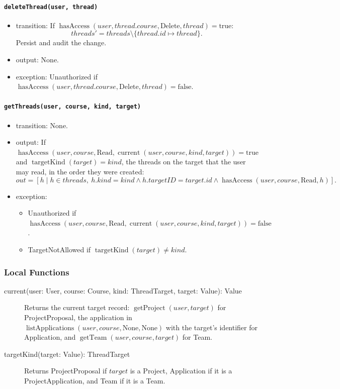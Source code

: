 \documentclass[12pt, titlepage]{article}
\begin{document}
\paragraph{\texttt{deleteThread(user, thread)}}
\begin{itemize}
    \item transition: If $\operatorname{hasAccess}(user,thread.course,\text{Delete},thread)=\text{true}$:
    \[
    \mathit{threads}'=\mathit{threads}\setminus\{thread.id\mapsto thread\}.
    \]
    Persist and audit the change.
    \item output: None.
    \item exception: Unauthorized if $\operatorname{hasAccess}(user,thread.course,\text{Delete},thread)=\text{false}$.
\end{itemize}

\paragraph{\texttt{getThreads(user, course, kind, target)}}
\begin{itemize}
    \item transition: None.
    \item output: If $\operatorname{hasAccess}(user,course,\text{Read},\operatorname{current}(user,course,kind,target))=\text{true}$ and $\operatorname{targetKind}(target)=kind$, the threads on the target that the user may read, in the order they were created:
    \[
    out=[h\mid h\in\mathit{threads},\ h.kind=kind\land h.targetID=target.id\land\operatorname{hasAccess}(user,course,\text{Read},h)].
    \]
    \item exception:
    \begin{itemize}
        \item Unauthorized if $\operatorname{hasAccess}(user,course,\text{Read},\operatorname{current}(user,course,kind,target))=\text{false}$.
        \item TargetNotAllowed if $\operatorname{targetKind}(target)\ne kind$.
    \end{itemize}
\end{itemize}

\subsubsection{Local Functions}

\begin{description}
    \item[current(user: User, course: Course, kind: ThreadTarget, target: Value): Value] Returns the current target record: $\operatorname{getProject}(user,target)$ for ProjectProposal, the application in $\operatorname{listApplications}(user,course,\text{None},\text{None})$ with the target's identifier for Application, and $\operatorname{getTeam}(user,course,target)$ for Team.
    \item[targetKind(target: Value): ThreadTarget] Returns ProjectProposal if $target$ is a Project, Application if it is a ProjectApplication, and Team if it is a Team.
\end{description}
\end{document}
